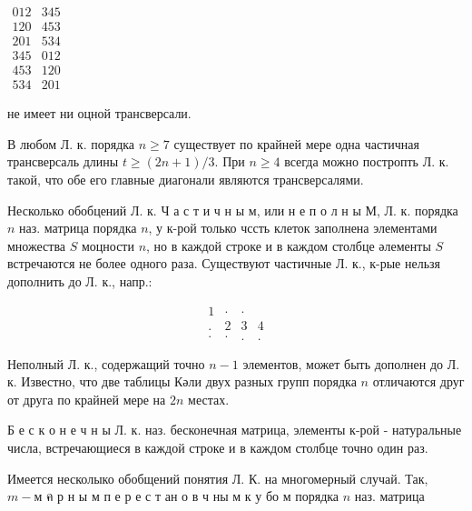 \documentclass[10pt]{article}
\begin{document}
$\begin{array}{ll}012 & 345 \\ 120 & 453 \\ 201 & 534 \\ 345 & 012 \\ 453 & 120 \\ 534 & 201\end{array}$



не имеет ни оцной трансверсали.



В любом Л. к. порядка $n \geqslant 7$ существует по крайней мере одна частичная трансверсаль длины $t \geqslant(2 n+1) / 3$. При $n \geqslant 4$ всегда можно постропть Л. к. такой, что обе его главные диагонали являются трансверсалями.



Несколько обобцений Л. к. Ч а с т и ч н ы м, или н е п о л н ы М, Л. к. порядка $n$ наз. матрица порядка $n$, у к-рой только чссть клеток заполнена элементами множества $S$ моцности $n$, но в каждой строке и в каждом столбце әлементы $S$ встречаются не более одного раза. Существуют частичные Л. к., к-рые нельзя дополнить до Л. к., напр.:



\[

\begin{array}{llll}

1 & \cdot & \cdot & \\

. & 2 & 3 & 4 \\

\cdot & \cdot & . & .

\end{array}

\]



Неполный Л. к., содержащий точно $n-1$ элементов, может быть дополнен до Л. к. Известно, что две таблицы Кәли двух разных групп порядка $n$ отличаются друг от друга по крайней мере на $2 n$ местах.



Б е с к о н е ч н ы Л. к. наз. бесконечная матрица, элементы к-рой - натуральные числа, встречающиеся в каждой строке и в каждом столбце точно один раз.



Имеется несколыко обобщений понятия Л. К. на многомерный случай. Так, $m-м$ ค р н ы м п е р е с т ан о в ч ны м к у бо м порядка $n$ наз. матрица
\end{document}
